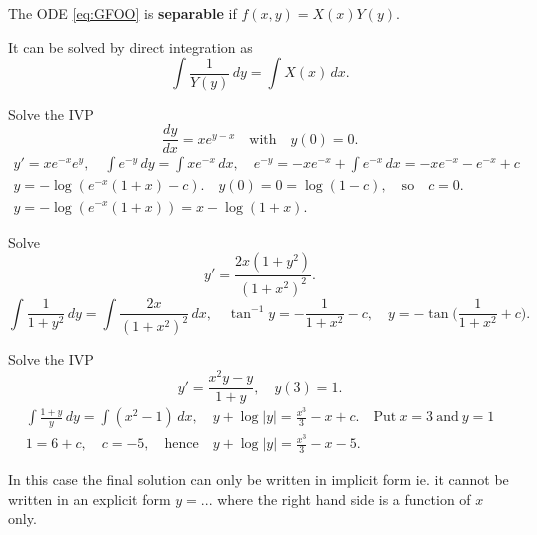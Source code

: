 The ODE \eqref{eq:GFOO} is \textbf{separable} if $f(x,y)=X(x)Y(y).$ 

It can be solved by direct integration as
\[\int \frac{1}{Y(y)}\,dy=\int X(x)\,dx.\]

\begin{example}
    Solve the IVP \[\frac{dy}{dx}=xe^{y-x} \quad
    \text{with} \quad y(0)=0.\]
    \begin{equation*}
        \begin{gathered}
            y'=xe^{-x}e^y, \quad \int e^{-y}\,dy=\int xe^{-x}\,dx, \quad e^{-y}=-xe^{-x}+\int e^{-x}\,dx=-xe^{-x}-e^{-x}+c \\
            y=-\log(e^{-x}(1+x)-c). \quad y(0)=0=\log(1-c), \quad \text{so}\quad c=0. \\
            y=-\log(e^{-x}(1+x))=x-\log(1+x).
        \end{gathered}
    \end{equation*}
\end{example}

\begin{example}
    Solve \[y'=\frac{2x(1+y^2)}{(1+x^2)^2}.\]
    \[\int \frac{1}{1+y^2}\,dy=\int \frac{2x}{(1+x^2)^2}\,dx, \quad \tan^{-1}y=-\frac{1}{1+x^2}-c, \quad y=-\tan\bigg(\frac{1}{1+x^2}+c\bigg).\]
\end{example}

\begin{example}
    Solve the IVP \[y'=\frac{x^2y-y}{1+y}, \quad y(3)=1.\]
    \begin{equation*}
        \begin{gathered}
            \int \frac{1+y}{y}\,dy=\int (x^2-1)\, dx, \quad y+\log|y|=\frac{x^3}{3}-x+c.\quad \text{Put}\ x=3\ \text{and} \ y=1 \\
            1=6+c, \quad c=-5, \quad \text{hence} \quad y+\log|y|=\frac{x^3}{3}-x-5.
        \end{gathered}
    \end{equation*}
    
    In this case the final solution can only be written in implicit form ie. it cannot be written in an explicit form $y=...$ where the right hand side is a function of $x$ only.
\end{example}

\newpage

